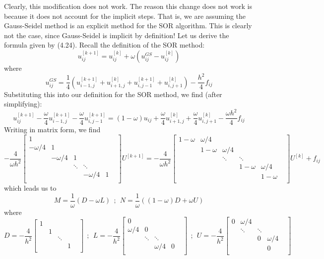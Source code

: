 \documentclass{article}
\begin{document}
Clearly, this modification does not work. The reason this change does not work is because it does not account for the implicit steps. That is, we are assuming the Gauss-Seidel method is an explicit method for the SOR algorithm. This is clearly not the case, since Gauss-Seidel is implicit by definition! Let us derive the formula given by (4.24).
\newline
Recall the definition of the SOR method:
\[u_{ij}^{[k+1]} = u_{ij}^{[k]} + \omega(u_{ij}^{GS} - u_{ij}^{[k]})\]
where
\[u_{ij}^{GS} = \frac{1}{4}(u_{i-1,j}^{[k+1]} + u_{i+1,j}^{[k]} + u_{i,j-1}^{[k+1]} + u_{i,j+1}^{[k]}) - \frac{h^2}{4}f_{ij}\]
Substituting this into our definition for the SOR method, we find (after simplifying):
\[u_{ij}^{[k+1]} - \frac{\omega}{4}u_{i-1,j}^{[k+1]} - \frac{\omega}{4}u_{i,j-1}^{[k+1]} = (1 - \omega)u_{ij} + \frac{\omega}{4}u_{i+1,j}^{[k]} + \frac{\omega}{4}u_{i,j+1}^{[k]} - \frac{\omega h^2}{4}f_{ij}\]
Writing in matrix form, we find
\[-\frac{4}{\omega h^2}\begin{bmatrix}
    1 & & & & & \\
    -\omega /4 & 1 & & & \\
     & -\omega / 4 & 1 & & \\
     & & \ddots & \ddots & & \\
     & & & -\omega / 4 & 1\\
\end{bmatrix}U^{[k+1]} = -\frac{4}{\omega h^2}\begin{bmatrix}
    1-\omega & \omega /4 & & & & \\
     & 1-\omega & \omega /4 & & & \\
     & & \ddots & \ddots\\
     & & &1-\omega & \omega /4\\
     & & & & 1-\omega \\
\end{bmatrix} U^{[k]} + f_{ij}\]
which leads us to
\[M = \frac{1}{\omega}(D - \omega L) \:\: ; \:\: N = \frac{1}{\omega}((1-\omega)D + \omega U)\]
where
\[D = -\frac{4}{h^2}\begin{bmatrix}
    1 & & & & \\
     & 1 & & & \\
     & &\ddots & & \\
     & & & 1\\
\end{bmatrix} \:\: ; \: \: L = -\frac{4}{h^2} \begin{bmatrix}
    0 & & & & \\
    \omega / 4 & 0 & & & \\
    & \ddots & \ddots & & \\
    & & \omega / 4 & 0 \\
\end{bmatrix} \:\: ; \:\: U = -\frac{4}{h^2}\begin{bmatrix}
    0 & \omega /4 & & & \\
    & \ddots & \ddots & \\
    & & 0 & \omega /4 \\
    & & & 0 \\
\end{bmatrix}\]
\end{document}
